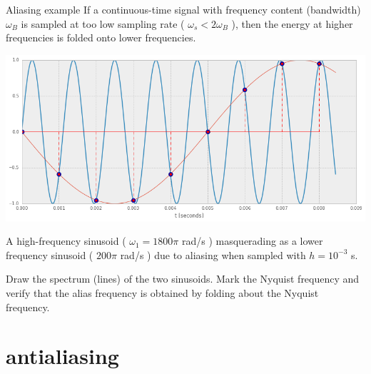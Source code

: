\documentclass[presentation,aspectratio=169]{beamer}
\begin{document}
\begin{frame}[label={sec:org47ea48c}]{Aliasing example}
If a continuous-time signal with frequency content (bandwidth) \(\omega_B\) is sampled at too low sampling rate ( \(\omega_s < 2\omega_B\) ), then the energy at higher frequencies is folded onto lower frequencies. 

\begin{center}
\includegraphics[width=0.6\linewidth]{../../figures/aliasing-example.png}
\end{center}
A high-frequency sinusoid ( \(\omega_1 = 1800\pi\) rad/s ) masquerading as a lower frequency sinusoid ( \(200 \pi\) rad/s ) due to aliasing when sampled with \(h=10^{-3}\) s.

\alert{Draw the spectrum (lines) of the two sinusoids. Mark the Nyquist frequency and verify that the alias frequency is obtained by folding about the Nyquist frequency.}
\end{frame}



\section{antialiasing}
\label{sec:orged21929}
\end{document}
